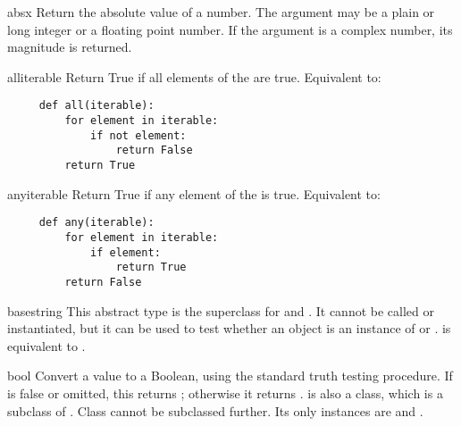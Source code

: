 \begin{funcdesc}{abs}{x}
  Return the absolute value of a number.  The argument may be a plain
  or long integer or a floating point number.  If the argument is a
  complex number, its magnitude is returned.
\end{funcdesc}

\begin{funcdesc}{all}{iterable}
  Return True if all elements of the  are true.
  Equivalent to:
  \begin{verbatim}
     def all(iterable):
         for element in iterable:
             if not element:
                 return False
         return True
  \end{verbatim}
\end{funcdesc}

\begin{funcdesc}{any}{iterable}
  Return True if any element of the  is true.
  Equivalent to:
  \begin{verbatim}
     def any(iterable):
         for element in iterable:
             if element:
                 return True
         return False
  \end{verbatim}
\end{funcdesc}

\begin{funcdesc}{basestring}{}
  This abstract type is the superclass for  and .
  It cannot be called or instantiated, but it can be used to test whether
  an object is an instance of  or .
   is equivalent to
  .
\end{funcdesc}

\begin{funcdesc}{bool}{}
  Convert a value to a Boolean, using the standard truth testing
  procedure.  If  is false or omitted, this returns
  ; otherwise it returns .
   is also a class, which is a subclass of .
  Class  cannot be subclassed further.  Its only instances
  are  and .

\end{funcdesc}

